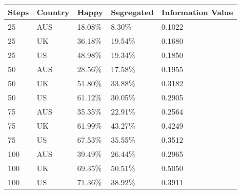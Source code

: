 \begin{table}[ht]
\centering
\begin{tabular}{lllll}
  \hline
Steps & Country & Happy & Segregated & Information Value \\ 
  \hline
25 & AUS & 18.08\% & 8.30\% & 0.1022 \\ 
  25 & UK & 36.18\% & 19.54\% & 0.1680 \\ 
  25 & US & 48.98\% & 19.34\% & 0.1850 \\ 
  50 & AUS & 28.56\% & 17.58\% & 0.1955 \\ 
  50 & UK & 51.80\% & 33.88\% & 0.3182 \\ 
  50 & US & 61.12\% & 30.05\% & 0.2905 \\ 
  75 & AUS & 35.35\% & 22.91\% & 0.2564 \\ 
  75 & UK & 61.99\% & 43.27\% & 0.4249 \\ 
  75 & US & 67.53\% & 35.55\% & 0.3512 \\ 
  100 & AUS & 39.49\% & 26.44\% & 0.2965 \\ 
  100 & UK & 69.35\% & 50.51\% & 0.5050 \\ 
  100 & US & 71.36\% & 38.92\% & 0.3911 \\ 
   \hline
\end{tabular}
\end{table}
